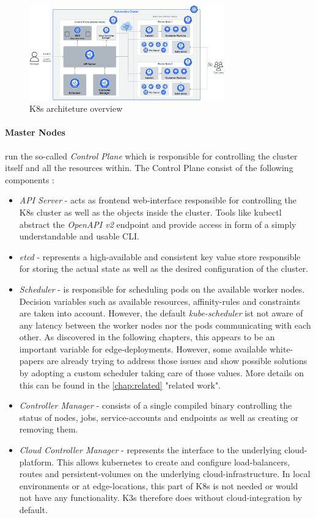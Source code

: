 \documentclass[MIC,Master,english]{twbook}%
\begin{document}
\begin{figure}[ht]
    \centering
    \includegraphics[width=0.75\textwidth]{PICs/k8s-architecture.png}
    \caption{\ac{K8s} architeture overview\cite{pic-k8s-overview}}
    \label{fig:k8s-architecture}
\end{figure}

\paragraph{Master Nodes} run the so-called \textit{Control Plane} which is responsible for controlling the cluster itself and all the resources within. The Control Plane consist of the following components \cite{k8scomp}:
\begin{itemize}
    \item \textit{API Server} - acts as frontend web-interface responsible for controlling the \ac{K8s} cluster as well as the objects inside the cluster. Tools like kubectl abstract the \textit{OpenAPI v2} endpoint and provide access in form of a simply understandable and usable \ac{CLI}. 
    \item \textit{etcd} - represents a high-available and consistent key value store responsible for storing the actual state as well as the desired configuration of the cluster.
    \item \textit{Scheduler} - is responsible for scheduling pods on the available worker nodes. Decision variables such as available resources, affinity-rules and constraints are taken into account. However, the default \textit{kube-scheduler} ist not aware of any latency between the worker nodes nor the pods communicating with each other. As discovered in the following chapters, this appears to be an important variable for edge-deployments. However, some available white-papers are already trying to address those issues and show possible solutions by adopting a custom scheduler taking care of those values. More details on this can be found in the \autoref{chap:related} "related work".
    \item \textit{Controller Manager} - consists of a single compiled binary controlling the status of nodes, jobs, service-accounts and endpoints as well as creating or removing them.
    \item \textit{Cloud Controller Manager} - represents the interface to the underlying cloud-platform. This allows kubernetes to create and configure load-balancers, routes and persistent-volumes on the underlying cloud-infrastructure. In local environments or at edge-locations, this part of \ac{K8s} is not needed or would not have any functionality. K3s therefore does without cloud-integration by default\cite{minikube}.
\end{itemize}
\end{document}
